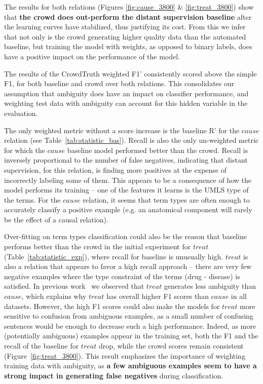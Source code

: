 The results for both relations (Figures \ref{fig:cause_3800} \& \ref{fig:treat_3800}) show that \textbf{the crowd does out-perform the distant supervision baseline} after the learning curves have stabilized, thus justifying its cost. From this we infer that not only is the crowd generating higher quality data than the automated baseline, but training the model with weights, as opposed to binary labels, does have a positive impact on the performance of the model.

The results of the CrowdTruth weighted F1' consistently scored above the simple F1, for both baseline and crowd over both relations.  This consolidates our assumption that ambiguity does have an impact on classifier performance, and weighting test data with ambiguity can account for this hidden variable in the evaluation.

The only weighted metric without a score increase is the baseline R' for the $cause$ relation (see Table~\ref{tab:statistic_bas}). Recall is also the only un-weighted metric for which the $cause$ baseline model performed better than the crowd. Recall is inversely proportional to the number of false negatives, indicating that distant supervision, for this relation, is finding more positives at the expense of incorrectly labeling some of them.  This appears to be a consequence of how the model performs its training -- one of the features it learns is the UMLS type of the terms. For the $cause$ relation, it seems that term types are often enough to accurately classify a positive example (e.g. an anatomical component will rarely be the effect of a causal relation).

Over-fitting on term types classification could also be the reason that baseline performs better than the crowd in the initial experiment for $treat$ (Table~\ref{tab:statistic_exp}), where recall for baseline is unusually high. $treat$ is also a relation that appears to favor a high recall approach -- there are very few negative examples where the type constraint of the terms (drug - disease) is satisfied. In previous work~\cite{aroyo2014threesides} we observed that $treat$ generates less ambiguity than $cause$, which explains why $treat$ has overall higher F1 scores than $cause$ in all datasets. However, the high F1 scores could also make the models for $treat$ more sensitive to confusion from ambiguous examples, as a small number of confusing sentences would be enough to decrease such a high performance. Indeed, as more (potentially ambiguous) examples appear in the training set, both the F1 and the recall of the baseline for $treat$ drop, while the crowd scores remain consistent (Figure~\ref{fig:treat_3800}). This result emphasizes the importance of weighting training data with ambiguity, as \textbf{a few ambiguous examples seem to have a strong impact in generating false negatives} during classification.

